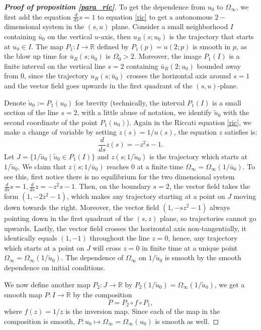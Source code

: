 \documentclass[letterpaper,11pt]{article}
\numberwithin{equation}{section}
\theoremstyle{plain}
\begin{document}
\begin{proof}[\textbf{Proof of proposition \ref{para_ric}}] To get the dependence from $u_0$ to $\Omega_\infty$, we first add the equation $\frac{d}{ds}s=1$ to equation \eqref{ric} to get a autonomous $2-$dimensional system in the $(s,u)$ plane. Consider a small neighborhood $I$ containing $\bar{u}_0$ on the vertical $u$-axis, then $u_R(s; u_0)$ is the trajectory that starts at $u_0 \in I$. The map $P_1 : I \to \mathbb{R}$ defined by $P_1(p) = u(2; p)$ is smooth in $p$, as the blow up time for $\bar{u}_R(s;\bar{u}_0)$ is $\Omega_0 >2$. Moreover, the image $P_1(I)$ is a finite interval on the vertical line $s=2$ containing $\bar{u}_R(2;u_0)$ bounded away from $0$, since the trajectory $u_R(s;\bar{u}_0)$ crosses the horizontal axis around $s=1$ and the vector field goes upwards in the first quadrant of the $(s,u)$-plane.

Denote $\tilde{u}_0:= P_1(u_0)$ for brevity (technically, the interval $P_1(I)$ is a small section of the line $s=2$, with a little abuse of notation, we identify $\tilde{u}_0$ with the second coordinate of the point $P_1(u_0)$). Again in the Riccati equation \eqref{ric}, we make a change of variable by setting $z(s) = 1/u(s)$, the equation $z$ satisfies is:
\[
\frac{d}{ds}z(s) = -z^2s -1.
\]
Let $J = \{ 1/\tilde{u}_0 \mid  \tilde{u}_0 \in P_1(I)\}$ and $z(s; 1/\tilde{u}_0)$ is the trajectory which starts at $1/\tilde{u}_0$. We claim that $z(s; 1/\bar{u}_0)$ reaches $0$ at a finite time $\Omega_\infty = \Omega_\infty(1/\bar{u}_0)$. To see this, first notice there is no equilibrium for the two dimensional system $\frac{d}{ds}s=1, \frac{d}{ds}z=-z^2s-1$. Then, on the boundary $s=2$, the vector field takes the form $(1,-2z^2-1)$, which makes any trajectory starting at a point on $J$ moving down towards the right. Moreover, the vector field $(1,-sz^2-1)$ always pointing down in the first quadrant of the $(s,z)$ plane, so trajectories cannot go upwards. Lastly, the vector field crosses the horizontal axis non-tangentially, it identically equals $(1,-1)$ throughout the line $z=0$, hence, any trajectory which starts at a point on $J$ will cross $z=0$ in finite time at a unique point $\Omega_\infty = \Omega_\infty(1/\tilde{u}_0)$. The dependence of $\Omega_\infty$ on $1/\tilde{u}_0$ is smooth by the smooth dependence on initial conditions.

 We now define another map $P_2 : J \to \mathbb{R}$ by $P_2(1/\tilde{u}_0) = \Omega_\infty(1/\tilde{u}_0)$, we get a smooth map $P: I \to \mathbb{R}$ by the composition
 \[
 P =P_2 \circ f \circ P_1,
 \] 
 where $f(z) = 1/z$ is the inversion map. Since each of the map in the composition is smooth, $P: u_0 \mapsto \Omega_\infty = \Omega_\infty(u_0)$ is smooth as well.


\end{proof}
\end{document}
